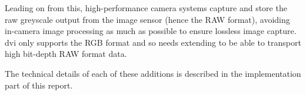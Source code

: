 Leading on from this, high-performance camera systems capture and store the raw greyscale output from the image sensor (hence the RAW format), avoiding in-camera image processing as much as possible to ensure lossless image capture. \gls{dvi} only supports the RGB format and so needs extending to be able to transport high bit-depth RAW format data.
 
The technical details of each of these additions is described in the implementation part of this report.

